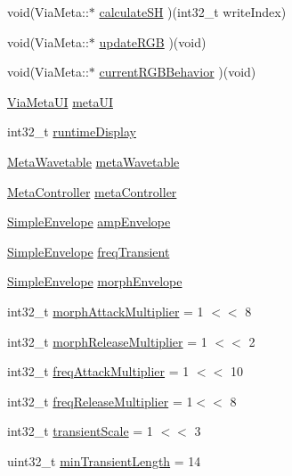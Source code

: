 \begin{DoxyCompactItemize}
\item 
void(Via\+Meta\+::$\ast$ \mbox{\hyperlink{class_via_meta_abd9b66a2e79446a5275fad25ef40e90f}{calculate\+SH}} )(int32\+\_\+t write\+Index)
\item 
void(Via\+Meta\+::$\ast$ \mbox{\hyperlink{class_via_meta_a56b5fee57636b4d7b6b0be80145ae474}{update\+R\+GB}} )(void)
\item 
void(Via\+Meta\+::$\ast$ \mbox{\hyperlink{class_via_meta_adf6d6ae0cdfa6275d756988494c72bda}{current\+R\+G\+B\+Behavior}} )(void)
\item 
\mbox{\hyperlink{class_via_meta_1_1_via_meta_u_i}{Via\+Meta\+UI}} \mbox{\hyperlink{class_via_meta_a55ce1aad65d98dc744ad0efcfd9047d1}{meta\+UI}}
\item 
int32\+\_\+t \mbox{\hyperlink{class_via_meta_a849f78f2ca06dd8d5df280ac74f7f2df}{runtime\+Display}}
\item 
\mbox{\hyperlink{class_meta_wavetable}{Meta\+Wavetable}} \mbox{\hyperlink{class_via_meta_a181153d602eb58e635cad28f06afa7eb}{meta\+Wavetable}}
\item 
\mbox{\hyperlink{class_meta_controller}{Meta\+Controller}} \mbox{\hyperlink{class_via_meta_ae825571bb029bcd9ddbe8a2c19f041a5}{meta\+Controller}}
\item 
\mbox{\hyperlink{class_simple_envelope}{Simple\+Envelope}} \mbox{\hyperlink{class_via_meta_a1bbd7242c6133f93cd5732ce6add7f87}{amp\+Envelope}}
\item 
\mbox{\hyperlink{class_simple_envelope}{Simple\+Envelope}} \mbox{\hyperlink{class_via_meta_a1ff8bd7ec2f612c9114330b6d451bddc}{freq\+Transient}}
\item 
\mbox{\hyperlink{class_simple_envelope}{Simple\+Envelope}} \mbox{\hyperlink{class_via_meta_acb397704a71ed2eb11218c5d96e5e622}{morph\+Envelope}}
\item 
int32\+\_\+t \mbox{\hyperlink{class_via_meta_acc661a6ed6ca9a096f1dfb7ebfac724f}{morph\+Attack\+Multiplier}} = 1 $<$$<$ 8
\item 
int32\+\_\+t \mbox{\hyperlink{class_via_meta_a583404362a04ac999f086ab9899fa2e4}{morph\+Release\+Multiplier}} = 1 $<$$<$ 2
\item 
int32\+\_\+t \mbox{\hyperlink{class_via_meta_afbc54709d93d43fa6e2508206d280fd4}{freq\+Attack\+Multiplier}} = 1 $<$$<$ 10
\item 
int32\+\_\+t \mbox{\hyperlink{class_via_meta_a2dc1962ea9604adccb61269572acdeb4}{freq\+Release\+Multiplier}} = 1$<$$<$ 8
\item 
int32\+\_\+t \mbox{\hyperlink{class_via_meta_a76c5199c165cb7cdc09ec135e941710f}{transient\+Scale}} = 1 $<$$<$ 3
\item 
uint32\+\_\+t \mbox{\hyperlink{class_via_meta_a4cedfcb63af32f4c03ce682559741b3d}{min\+Transient\+Length}} = 14
\end{DoxyCompactItemize}
